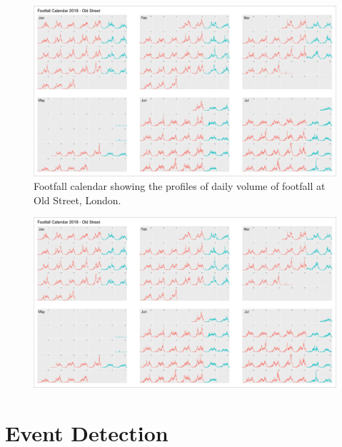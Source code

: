 \cleartoleftpage
{}
\begin{figure}
  \forceversofloat
  \includegraphics[width=172mm,trim={0 0 1310 0},clip]{images/applications-footfall-calendar.png}
  \caption{Footfall calendar showing the profiles of daily volume of footfall at Old Street, London.}
  \label{}
\end{figure}
\clearpage
\begin{figure}
  \forcerectofloat
  \includegraphics[width=172mm,trim={1315 0 0 0},clip]{images/applications-footfall-calendar.png}
  \caption[]{}
  \label{}
\end{figure}
\restoregeometry
\clearpage

\lipsum[1-2]

\section{Event Detection}

